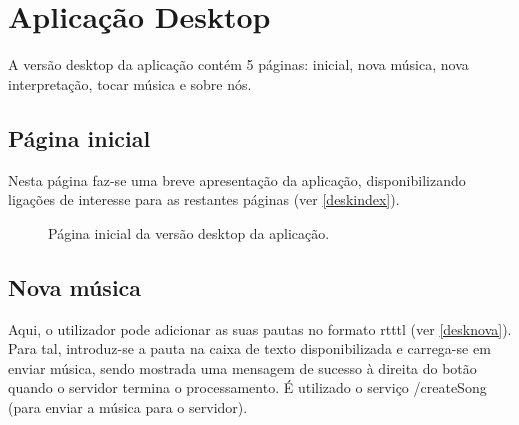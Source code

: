 \section{Aplicação Desktop}

A versão desktop da aplicação contém 5 páginas: inicial, nova música, nova interpretação, tocar música e sobre nós.

\subsection{Página inicial}
Nesta página faz-se uma breve apresentação da aplicação, disponibilizando ligações de interesse para as restantes páginas (ver \autoref{deskindex}).

\begin{figure}[htp]
\centering
{}
\caption{Página inicial da versão desktop da aplicação.}
\label{deskindex}
\end{figure}

\subsection{Nova música}
Aqui, o utilizador pode adicionar as suas pautas no formato \ac{rtttl} (ver \autoref{desknova}). Para tal, introduz-se a pauta na caixa de texto disponibilizada e carrega-se em enviar música, sendo mostrada uma mensagem de sucesso à direita do botão quando o servidor termina o processamento. É utilizado o serviço /createSong (para enviar a música para o servidor).

